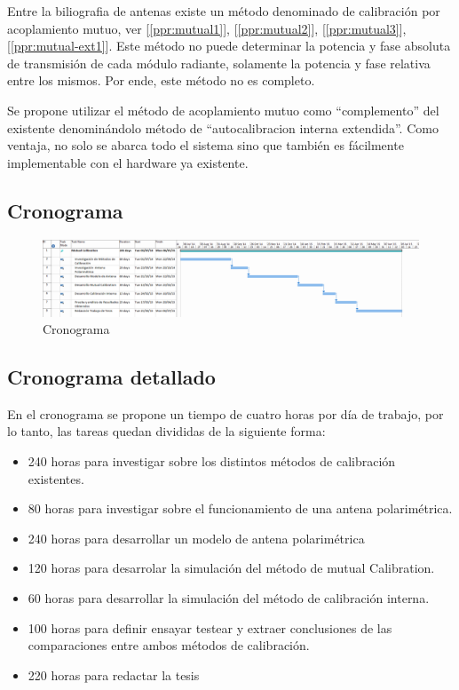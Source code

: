 \documentclass[a4paper,10pt]{article}
\begin{document}
Entre la biliografia de antenas existe un método denominado de calibración por 
acoplamiento mutuo, ver [\ref{ppr:mutual1}], [\ref{ppr:mutual2}], 
[\ref{ppr:mutual3}], [\ref{ppr:mutual-ext1}]. Este método no puede determinar la
 potencia y fase absoluta de transmisión de cada módulo radiante, solamente la 
potencia y fase relativa entre los mismos. Por ende, este método no es completo.

Se propone utilizar el método de acoplamiento mutuo como “complemento” del 
existente denominándolo método de “autocalibracion interna extendida”. Como 
ventaja, no solo se abarca todo el sistema sino que también es fácilmente 
implementable con el hardware ya existente. 

\thispagestyle{lscape}
\begin{landscape}
 
    \section{Cronograma}
	
\begin{figure}[!htb]
 \centering
 \includegraphics[width=1.5\textwidth]{Imagenes/CronogramaTesis.png}
 \caption{Cronograma}
 \label{fig:crono}
\end{figure}

    \end{landscape}
\restoregeometry
       
    \subsection{Cronograma detallado}

En el cronograma se propone un tiempo de cuatro horas por día de trabajo, por lo tanto, las tareas quedan divididas de la siguiente forma:

\begin{itemize}
    \item 240 horas para investigar sobre los distintos métodos de calibración existentes.
    \item 80 horas para investigar sobre el funcionamiento de una antena polarimétrica.
    \item 240 horas para desarrollar un modelo de antena polarimétrica
    \item 120 horas para desarrolar la simulación del método de mutual Calibration.
    \item 60 horas para desarrollar la simulación del método de calibración interna.
    \item 100 horas para definir ensayar testear y extraer conclusiones de las 
comparaciones entre ambos métodos de calibración.
    \item 220 horas para redactar la tesis
\end{itemize}
\end{document}

